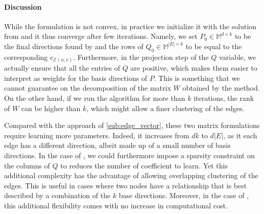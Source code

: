\paragraph{Discussion}

While the \pqt{} formulation is not convex, in practice we initialize it with the solution from
\combined{} and it thus converge after few iterations. Namely, we set $P_0 \in \mathbb{M}^{d\times
k}$ to be the final directions found by \combined{} and the rows of $Q_0 \in \mathbb{M}^{|E|\times
k}$ to be equal to the corresponding $e_{\mathcal{E}(u,v)}$. Furthermore, in the projection
step of the $Q$ variable, we actually ensure that all the entries of $Q$ are positive, which makes
them easier to  interpret as weights for the basis directions of $P$. This is something that we
cannot guarantee on the decomposition of the matrix $W$ obtained by the \fwa{} method. On the other
hand, if we run the \fwa{} algorithm for more than $k$ iterations, the rank of $W$ can be higher
than $k$, which might allow a finer clustering of the edges.

Compared with the \combined{} approach of \autoref{sub:edge_vector}, these two matrix
formulations require learning more parameters. Indeed, it increases from $dk$ to $d|E|$, as it each
edge has a different direction, albeit made up of a small number of basis directions. In the case of
\pqt{}, we could furthermore impose a sparsity constraint on the columns of $Q$ to reduces the
number of coefficient to learn. Yet this additional complexity has the advantage of allowing
overlapping clustering of the edges. This is useful in cases where two nodes have a relationship
that is best described by a combination of the $k$ base directions. Moreover, in the case of \fwa{},
this additional flexibility comes with no increase in computational cost.

